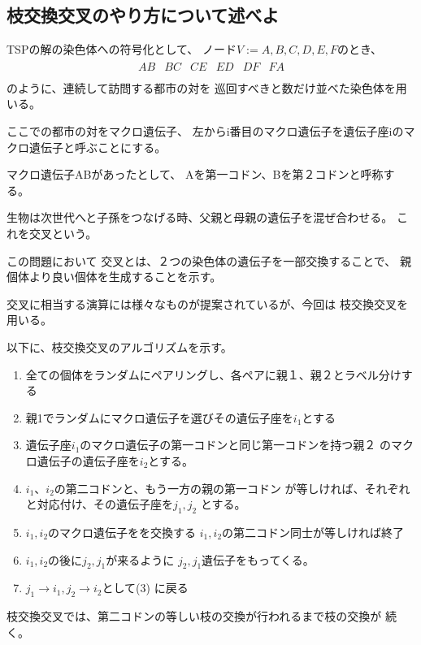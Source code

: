\documentclass[9pt]{ltjsarticle}
\begin{document}
\subsection{枝交換交叉のやり方について述べよ}
\begin{tcolorbox}[title=TSPの解の染色体への符号化]
    TSPの解の染色体への符号化として、
    ノード$V:={A,B,C,D,E,F}$のとき、
    \begin{align*}
        \begin{matrix}
            AB&BC&CE&ED&DF&FA\\
        \end{matrix}
    \end{align*}
    のように、連続して訪問する都市の対を
    巡回すべきと数だけ並べた染色体を用いる。

    ここでの都市の対をマクロ遺伝子、
    左からi番目のマクロ遺伝子を遺伝子座iのマクロ遺伝子と呼ぶことにする。

    マクロ遺伝子ABがあったとして、
    Aを第一コドン、Bを第２コドンと呼称する。
\end{tcolorbox}
   生物は次世代へと子孫をつなげる時、父親と母親の遺伝子を混ぜ合わせる。
    これを交叉という。

    この問題において
    交叉とは、２つの染色体の遺伝子を一部交換することで、
    親個体より良い個体を生成することを示す。

    交叉に相当する演算には様々なものが提案されているが、今回は
    枝交換交叉を用いる。

    以下に、枝交換交叉のアルゴリズムを示す。
\begin{tcolorbox}[title=交叉に相当する操作]
\begin{enumerate}
    \item 全ての個体をランダムにペアリングし、各ペアに親１、親２とラベル分けする
    \item 親1でランダムにマクロ遺伝子を選びその遺伝子座を$i_1$とする
    \item 遺伝子座$i_1$のマクロ遺伝子の第一コドンと同じ第一コドンを持つ親２
    のマクロ遺伝子の遺伝子座を$i_2$とする。
    \item $i_1$、$i_2$の第二コドンと、もう一方の親の第一コドン
    が等しければ、それぞれと対応付け、その遺伝子座を$j_1,j_2$
    とする。
    \item $i_1,i_2$のマクロ遺伝子をを交換する
    $i_1,i_2$の第二コドン同士が等しければ終了
    \item $i_1,i_2$の後に$j_2,j_1$が来るように
    $j_2,j_1$遺伝子をもってくる。
    \item $j_1\rightarrow i_1,j_2
    \rightarrow i_2$として(3)
    に戻る
\end{enumerate}
枝交換交叉では、第二コドンの等しい枝の交換が行われるまで枝の交換が
続く。
\end{tcolorbox}
\end{document}
